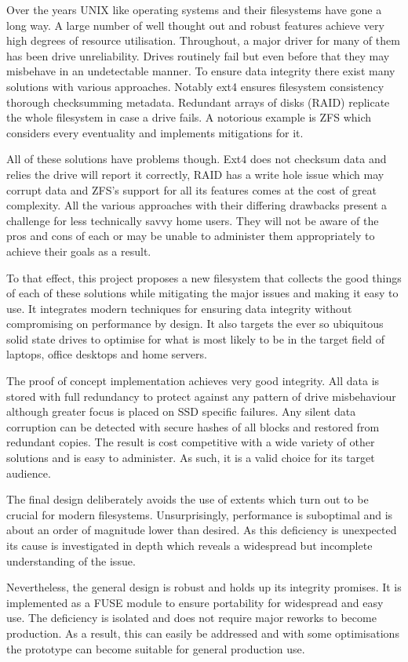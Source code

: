Over the years UNIX like operating systems and their filesystems have gone a
long way. A large number of well thought out and robust features achieve very
high degrees of resource utilisation. Throughout, a major driver for many of them has
been drive unreliability. Drives routinely fail but even before that they
may misbehave in an undetectable manner. To ensure data integrity there exist
many solutions with various approaches. Notably ext4 ensures filesystem
consistency thorough checksumming metadata. Redundant arrays of disks (RAID)
replicate the whole filesystem in case a drive fails. A notorious example is
ZFS which considers every eventuality and implements mitigations for it.

All of these solutions have problems though. Ext4 does not checksum data and
relies the drive will report it correctly, RAID has a write hole issue which
may corrupt data and ZFS's support for all its features comes at the cost of
great complexity. All the various approaches with their differing drawbacks
present a challenge for less technically savvy home users. They will not be
aware of the pros and cons of each or may be unable to administer them
appropriately to achieve their goals as a result.

To that effect, this project proposes a new filesystem that collects the good
things of each of these solutions while mitigating the major issues and making
it easy to use. It integrates modern techniques for ensuring data integrity
without compromising on performance by design. It also targets the ever so
ubiquitous solid state drives to optimise for what is most likely to be in the
target field of laptops, office desktops and home servers.

The proof of concept implementation achieves very good integrity. All data is
stored with full redundancy to protect against any pattern of drive
misbehaviour although greater focus is placed on SSD specific failures. Any
silent data corruption can be detected with secure hashes of all blocks and
restored from redundant copies. The result is cost competitive with a wide
variety of other solutions and is easy to administer. As such, it is a valid
choice for its target audience.

The final design deliberately avoids the use of extents which turn out to be
crucial for modern filesystems. Unsurprisingly, performance is suboptimal and
is about an order of magnitude lower than desired. As this deficiency is
unexpected its cause is investigated in depth which reveals a widespread but
incomplete understanding of the issue.

Nevertheless, the general design is robust and holds up its integrity promises.
It is implemented as a FUSE module to ensure portability for widespread and
easy use. The deficiency is isolated and does not require major reworks to
become production. As a result, this can easily be addressed and with some optimisations
the prototype can become suitable for general production use.
